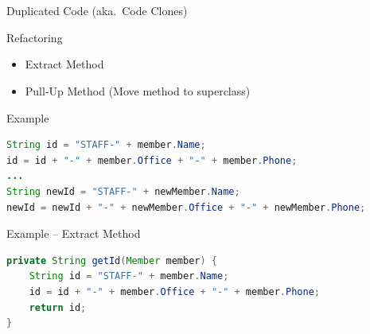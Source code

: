 \begin{frame}[fragile]
	\frametitle{\insertsubsection\ } %
	\begin{fancycolumns}[animation=keep]
		\begin{definition}{Duplicated Code (aka.\ Code Clones)}
		\end{definition}
		\begin{definition}{Refactoring}
			\begin{itemize}
				\item Extract Method
				\item Pull-Up Method (Move method to superclass)
			\end{itemize}
		\end{definition}
		\nextcolumn
		\begin{example}{Example}
			\begin{lstlisting}[language=Java,basicstyle=\small]
String id = "STAFF-" + member.Name;
id = id + "-" + member.Office + "-" + member.Phone;
...
String newId = "STAFF-" + newMember.Name;
newId = newId + "-" + newMember.Office + "-" + newMember.Phone;
			\end{lstlisting}
		\end{example}
			\begin{example}{Example -- Extract Method}
				\begin{lstlisting}[language=Java, basicstyle=\small]
private String getId(Member member) {
	String id = "STAFF-" + member.Name;
	id = id + "-" + member.Office + "-" + member.Phone;
	return id;
}
			\end{lstlisting}
			\end{example}
	\end{fancycolumns}
\end{frame}

